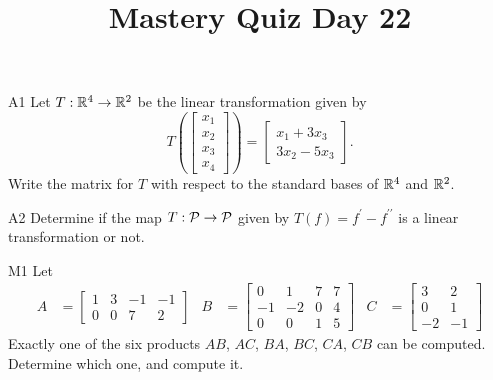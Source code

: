 \documentclass{sbgLAquiz}
\title{Mastery Quiz Day 22 }
\begin{document}
\begin{problem}{A1}
Let $T: \IR^4 \rightarrow \IR^2$ be the linear transformation given by $$T\left(\begin{bmatrix} x_1 \\ x_2 \\ x_3 \\ x_4 \end{bmatrix} \right) = \begin{bmatrix} x_1+3x_3 \\ 3x_2-5x_3 \end{bmatrix}.$$ Write the matrix for $T$ with respect to the standard bases of $\IR^4$ and $\IR^2$.
\end{problem}

\begin{problem}{A2}
Determine if the map $T: \P  \rightarrow \P$ given by $T(f) = f^{\prime}-f^{\prime \prime}$ is a linear transformation or not.
\end{problem}
\newpage

\begin{problem}{M1}
Let
\begin{align*}
A &= \begin{bmatrix} 1 & 3 & -1 & -1 \\ 0 & 0 & 7 & 2 \end{bmatrix} & B &= \begin{bmatrix} 0 & 1 & 7 & 7 \\ -1 & -2 & 0 & 4 \\ 0 & 0 & 1 & 5 \end{bmatrix} & C&=\begin{bmatrix} 3 & 2 \\ 0 & 1 \\ -2 & -1 \end{bmatrix}
\end{align*}
Exactly one of the six products $AB$, $AC$, $BA$, $BC$, $CA$, $CB$ can be computed.  Determine which one, and compute it.
\end{problem}
\end{document}
